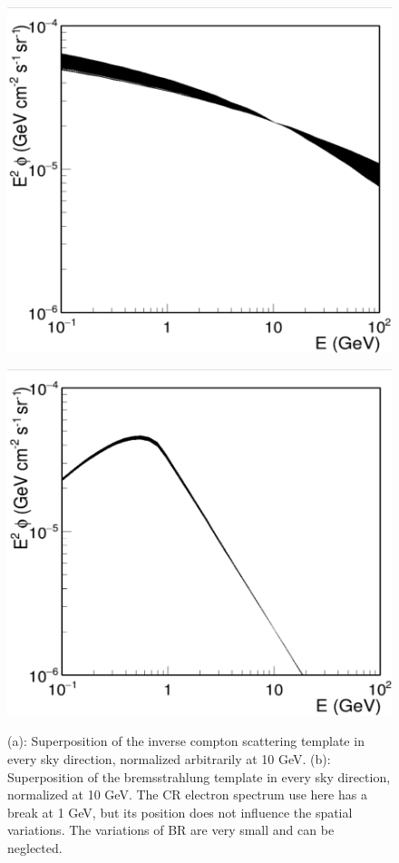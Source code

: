 \begin{figure}[h]
  \centering
  \begin{minipage}[h]{0.45\textwidth}
  	\centering
	\includegraphics[trim={0 0cm 0 0.2cm}, clip, width=1.\linewidth]{pic/method/IC_variations.png}
 	\subcaption{}
 	\label{fig:IC_variations}
  \end{minipage}
  \hfill
  \begin{minipage}[h]{0.45\textwidth}
	  \centering
	  \includegraphics[trim={0 0cm 0 0.2cm}, clip, width=1.\linewidth]{pic/method/BR_variations.png}
	  \subcaption{}
	  \label{fig:BR_variations}
  \end{minipage}
  \caption{(a): Superposition of the inverse compton scattering template in every sky direction, normalized arbitrarily at 10 GeV. (b): Superposition of the bremsstrahlung template in every sky direction, normalized at 10 GeV. The CR electron spectrum use here has a break at 1 GeV, but its position does not influence the spatial variations. The variations of BR are very small and can be neglected.}
  \label{fig:IC_BR_variations} 
\end{figure}


